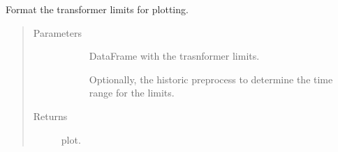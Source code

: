 \documentclass[letterpaper,10pt,english]{sphinxmanual}
\begin{document}
\begin{fulllineitems}
\label{\detokenize{autoapi/src/plot/format/index:src.plot.format.format_limits}}
Format the transformer limits for plotting.
\begin{quote}\begin{description}
\item[{Parameters}] \leavevmode\begin{description}
\item[{}] \leavevmode
DataFrame with the trasnformer limits.

\item[{}] \leavevmode
Optionally, the historic preprocess to determine the time range for the limits.

\end{description}

\item[{Returns}] \leavevmode\begin{description}
\item[{      plot.}] \leavevmode
\end{description}

\end{description}\end{quote}

\end{fulllineitems}

\end{document}
